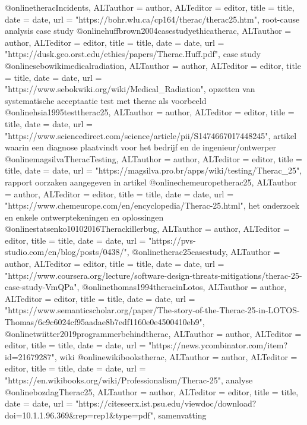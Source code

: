 {{@online{theracIncidents,	ALTauthor = {author},	ALTeditor = {editor},	title = {title},	date = {date},	url = {"https://bohr.wlu.ca/cp164/therac/therac25.htm"},}
\cite{theracIncidents}
root-cause analysis
case study
@online{huffbrown2004casestudyethicatherac,	ALTauthor = {author},	ALTeditor = {editor},	title = {title},	date = {date},	url = {"https://dusk.geo.orst.edu/ethics/papers/Therac.Huff.pdf"},}
\cite{huffbrown2004casestudyethicatherac}
case study
@online{sebowikimedicalradiation,	ALTauthor = {author},	ALTeditor = {editor},	title = {title},	date = {date},	url = {"https://www.sebokwiki.org/wiki/Medical_Radiation"},}
\cite{sebowikimedicalradiation}
opzetten van systematische acceptaatie test met therac als voorbeeld
@online{hsia1995testtherac25,	ALTauthor = {author},	ALTeditor = {editor},	title = {title},	date = {date},	url = {"https://www.sciencedirect.com/science/article/pii/S1474667017448245"},}
\cite{hsia1995testtherac25}
artikel waarin een diagnose plaatvindt voor het bedrijf en de ingenieur/ontwerper
@online{magsilvaTheracTesting,	ALTauthor = {author},	ALTeditor = {editor},	title = {title},	date = {date},	url = {"https://magsilva.pro.br/apps/wiki/testing/Therac_25"},}
\cite{magsilvaTheracTesting}
rapport
oorzaken aangegeven in artikel
@online{chemeuropetherac25,	ALTauthor = {author},	ALTeditor = {editor},	title = {title},	date = {date},	url = {"https://www.chemeurope.com/en/encyclopedia/Therac-25.html"},}
\cite{chemeuropetherac25}
het onderzoek en enkele ontwerptekeningen en oplossingen
@online{statsenko10102016Therackillerbug,	ALTauthor = {author},	ALTeditor = {editor},	title = {title},	date = {date},	url = {"https://pvs-studio.com/en/blog/posts/0438/"},}
\cite{statsenko10102016Therackillerbug}
@online{therac25casestudy,	ALTauthor = {author},	ALTeditor = {editor},	title = {title},	date = {date},	url = {"https://www.coursera.org/lecture/software-design-threats-mitigations/therac-25-case-study-VmQPa"},}
\cite{therac25casestudy}
@online{thomas1994theracinLotos,	ALTauthor = {author},	ALTeditor = {editor},	title = {title},	date = {date},	url = {"https://www.semanticscholar.org/paper/The-story-of-the-Therac-25-in-LOTOS-Thomas/6c9c6024cf95aadae8b7edf1160e0e4500410eb9"},}
\cite{thomas1994theracinLotos}
@online{twiitter2019programmerbehindtherac,	ALTauthor = {author},	ALTeditor = {editor},	title = {title},	date = {date},	url = {"https://news.ycombinator.com/item?id=21679287"},}
\cite{twitter2019programmerbehindtherac}
wiki
@online{wikibookstherac,	ALTauthor = {author},	ALTeditor = {editor},	title = {title},	date = {date},	url = {"https://en.wikibooks.org/wiki/Professionalism/Therac-25"},}
\cite{wikibookstherac}
analyse
@online{bozdagTherac25,	ALTauthor = {author},	ALTeditor = {editor},	title = {title},	date = {date},	url = {"https://citeseerx.ist.psu.edu/viewdoc/download?doi=10.1.1.96.369&rep=rep1&type=pdf"},}
\cite{bozdagTherac25}
samenvatting

}}
